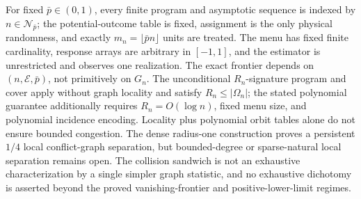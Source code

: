 For fixed \(\bar p\in(0,1)\), every finite program and asymptotic sequence is indexed by \(n\in\mathcal N_{\bar p}\); the potential-outcome table is fixed, assignment is the only physical randomness, and exactly \(m_n=\lfloor\bar p n\rfloor\) units are treated. The menu has fixed finite cardinality, response arrays are arbitrary in \([-1,1]\), and the estimator is unrestricted and observes one realization. The exact frontier depends on \((n,\mathcal E,\bar p)\), not primitively on \(G_n\). The unconditional \(R_n\)-signature program and cover apply without graph locality and satisfy \(R_n\le|\Omega_n|\); the stated polynomial guarantee additionally requires \(R_n=O(\log n)\), fixed menu size, and polynomial incidence encoding. Locality plus polynomial orbit tables alone do not ensure bounded congestion. The dense radius-one construction proves a persistent \(1/4\) local conflict-graph separation, but bounded-degree or sparse-natural local separation remains open. The collision sandwich is not an exhaustive characterization by a single simpler graph statistic, and no exhaustive dichotomy is asserted beyond the proved vanishing-frontier and positive-lower-limit regimes.